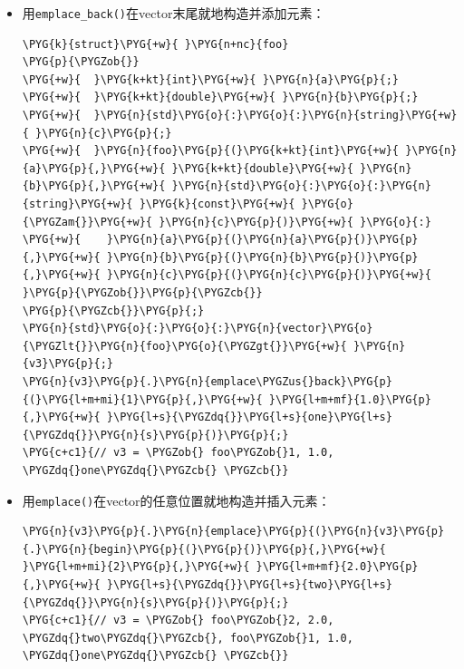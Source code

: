\begin{itemize}

\item 用\texttt{emplace\_\allowbreak{}back()}在vector末尾就地构造并添加元素：



\begin{codeblockbg}
\begin{Verbatim}[commandchars=\\\{\},breaklines=true,breakanywhere=true,fontsize=\codefont,xleftmargin=17bp]
\PYG{k}{struct}\PYG{+w}{ }\PYG{n+nc}{foo}
\PYG{p}{\PYGZob{}}
\PYG{+w}{  }\PYG{k+kt}{int}\PYG{+w}{ }\PYG{n}{a}\PYG{p}{;}
\PYG{+w}{  }\PYG{k+kt}{double}\PYG{+w}{ }\PYG{n}{b}\PYG{p}{;}
\PYG{+w}{  }\PYG{n}{std}\PYG{o}{:}\PYG{o}{:}\PYG{n}{string}\PYG{+w}{ }\PYG{n}{c}\PYG{p}{;}
\PYG{+w}{  }\PYG{n}{foo}\PYG{p}{(}\PYG{k+kt}{int}\PYG{+w}{ }\PYG{n}{a}\PYG{p}{,}\PYG{+w}{ }\PYG{k+kt}{double}\PYG{+w}{ }\PYG{n}{b}\PYG{p}{,}\PYG{+w}{ }\PYG{n}{std}\PYG{o}{:}\PYG{o}{:}\PYG{n}{string}\PYG{+w}{ }\PYG{k}{const}\PYG{+w}{ }\PYG{o}{\PYGZam{}}\PYG{+w}{ }\PYG{n}{c}\PYG{p}{)}\PYG{+w}{ }\PYG{o}{:}
\PYG{+w}{    }\PYG{n}{a}\PYG{p}{(}\PYG{n}{a}\PYG{p}{)}\PYG{p}{,}\PYG{+w}{ }\PYG{n}{b}\PYG{p}{(}\PYG{n}{b}\PYG{p}{)}\PYG{p}{,}\PYG{+w}{ }\PYG{n}{c}\PYG{p}{(}\PYG{n}{c}\PYG{p}{)}\PYG{+w}{ }\PYG{p}{\PYGZob{}}\PYG{p}{\PYGZcb{}}
\PYG{p}{\PYGZcb{}}\PYG{p}{;}
\PYG{n}{std}\PYG{o}{:}\PYG{o}{:}\PYG{n}{vector}\PYG{o}{\PYGZlt{}}\PYG{n}{foo}\PYG{o}{\PYGZgt{}}\PYG{+w}{ }\PYG{n}{v3}\PYG{p}{;}
\PYG{n}{v3}\PYG{p}{.}\PYG{n}{emplace\PYGZus{}back}\PYG{p}{(}\PYG{l+m+mi}{1}\PYG{p}{,}\PYG{+w}{ }\PYG{l+m+mf}{1.0}\PYG{p}{,}\PYG{+w}{ }\PYG{l+s}{\PYGZdq{}}\PYG{l+s}{one}\PYG{l+s}{\PYGZdq{}}\PYG{n}{s}\PYG{p}{)}\PYG{p}{;}
\PYG{c+c1}{// v3 = \PYGZob{} foo\PYGZob{}1, 1.0, \PYGZdq{}one\PYGZdq{}\PYGZcb{} \PYGZcb{}}
\end{Verbatim}
\end{codeblockbg}



\item 用\texttt{emplace()}在vector的任意位置就地构造并插入元素：



\begin{codeblockbg}
\begin{Verbatim}[commandchars=\\\{\},breaklines=true,breakanywhere=true,fontsize=\codefont,xleftmargin=17bp]
\PYG{n}{v3}\PYG{p}{.}\PYG{n}{emplace}\PYG{p}{(}\PYG{n}{v3}\PYG{p}{.}\PYG{n}{begin}\PYG{p}{(}\PYG{p}{)}\PYG{p}{,}\PYG{+w}{ }\PYG{l+m+mi}{2}\PYG{p}{,}\PYG{+w}{ }\PYG{l+m+mf}{2.0}\PYG{p}{,}\PYG{+w}{ }\PYG{l+s}{\PYGZdq{}}\PYG{l+s}{two}\PYG{l+s}{\PYGZdq{}}\PYG{n}{s}\PYG{p}{)}\PYG{p}{;}
\PYG{c+c1}{// v3 = \PYGZob{} foo\PYGZob{}2, 2.0, \PYGZdq{}two\PYGZdq{}\PYGZcb{}, foo\PYGZob{}1, 1.0, \PYGZdq{}one\PYGZdq{}\PYGZcb{} \PYGZcb{}}
\end{Verbatim}
\end{codeblockbg}

\end{itemize}


